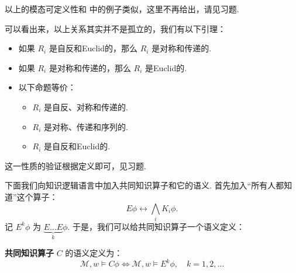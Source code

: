 以上的模态可定义性和 中的例子类似，这里不再给出，请见习题. 

可以看出来，以上关系其实并不是孤立的，我们有以下引理：

\begin{lemma}
\begin{itemize}
    \item 如果 $R_i$ 是自反和Euclid的，那么 $R_i$ 是对称和传递的.
    \item 如果 $R_i$ 是对称和传递的，那么 $R_i$ 是Euclid的.
    \item 以下命题等价：
    \begin{itemize}
        \item $R_i$ 是自反、对称和传递的.
        \item $R_i$ 是对称、传递和序列的.
        \item $R_i$ 是自反和Euclid的.
    \end{itemize}
\end{itemize}
\end{lemma}

这一性质的验证根据定义即可，见习题. 

下面我们向知识逻辑语言中加入共同知识算子和它的语义. 首先加入“所有人都知道”这个算子：
\[E\phi\leftrightarrow\bigwedge_i K_i\phi.\]
记 $E^k\phi$ 为 $\underbrace{E\dots E}_k\phi$. 于是，我们可以给共同知识算子一个语义定义：

\begin{definition}[共同知识算子]
\textbf{共同知识算子} $C$ 的语义定义为：
\[
\mathcal M,w\vDash C\phi\iff\mathcal M,w\vDash E^k\phi,\quad k=1,2,\dots
\]
\end{definition}

